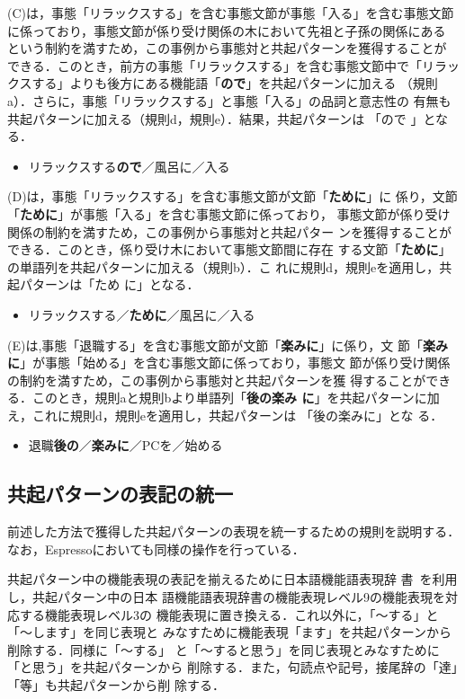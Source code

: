 \documentclass[japanese]{jnlp_1.4}
\begin{document}
(C)は，事態「リラックスする」を含む事態文節が事態「入る」を含む事態文節
に係っており，事態文節が係り受け関係の木において先祖と子孫の関係にある
という制約を満すため，この事例から事態対と共起パターンを獲得することが
できる．このとき，前方の事態「リラックスする」を含む事態文節中で「リラッ
クスする」よりも後方にある機能語「\textbf{ので}」を共起パターンに加える
（規則a）．さらに，事態「リラックスする」と事態「入る」の品詞と意志性の
有無も共起パターンに加える（規則d，規則e）．結果，共起パターンは
「ので
\linebreak
{}」となる．
\begin{itemize}
\item[(C)] リラックスする\textbf{ので}／風呂に／入る
\end{itemize}
(D)は，事態「リラックスする」を含む事態文節が文節「\textbf{ために}」に
係り，文節「\textbf{ために}」が事態「入る」を含む事態文節に係っており，
事態文節が係り受け関係の制約を満すため，この事例から事態対と共起パター
ンを獲得することができる．このとき，係り受け木において事態文節間に存在
する文節「\textbf{ために}」の単語列を共起パターンに加える（規則b）．こ
れに規則d，規則eを適用し，共起パターンは「ため
に」となる．
\begin{itemize}
\item[(D)] リラックスする／\textbf{ために}／風呂に／入る
\end{itemize}
(E)は,事態「退職する」を含む事態文節が文節「\textbf{楽みに}」に係り，文
節「\textbf{楽みに}」が事態「始める」を含む事態文節に係っており，事態文
節が係り受け関係の制約を満すため，この事例から事態対と共起パターンを獲
得することができる．このとき，規則aと規則bより単語列「\textbf{後の楽み
  に}」を共起パターンに加え，これに規則d，規則eを適用し，共起パターンは
「後の楽みに」とな
る．
\begin{itemize}
\item[(E)] 退職\textbf{後の}／\textbf{楽みに}／PCを／始める
\end{itemize}


\subsection{共起パターンの表記の統一}
\label{ssec:pattern3}

前述した方法で獲得した共起パターンの表現を統一するための規則を説明する．
なお，Espressoにおいても同様の操作を行っている．

共起パターン中の機能表現の表記を揃えるために日本語機能語表現辞
書~\cite{DBLP:conf/iccpol/MatsuyoshiSU06}を利用し，共起パターン中の日本
語機能語表現辞書の機能表現レベル9の機能表現を対応する機能表現レベル3の
機能表現に置き換える．これ以外に，「〜する」と「〜します」を同じ表現と
みなすために機能表現「ます」を共起パターンから削除する．同様に「〜する」
と「〜すると思う」を同じ表現とみなすために「と思う」を共起パターンから
削除する．また，句読点や記号，接尾辞の「達」「等」も共起パターンから削
除する．
\end{document}
